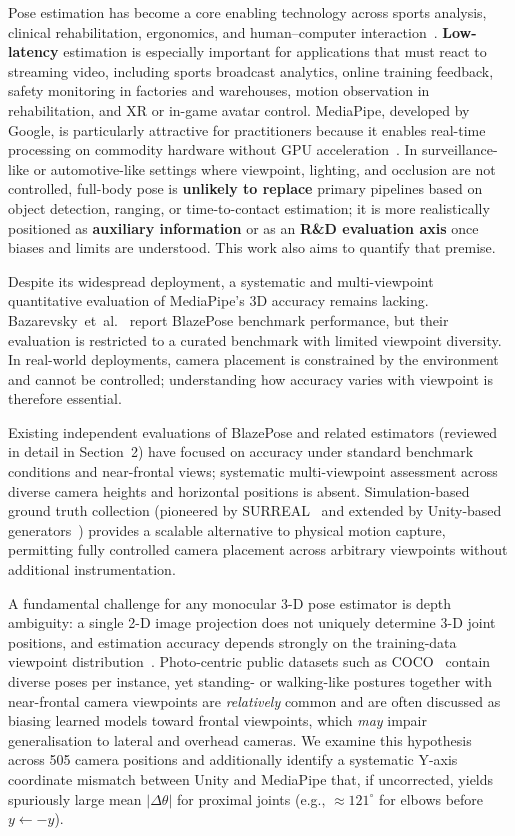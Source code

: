 \documentclass[english,fleqn]{ieej-e}
\begin{document}
Pose estimation has become a core enabling technology across sports
analysis, clinical rehabilitation, ergonomics, and human--computer
interaction~\cite{mediapipe,blazepose}.
\textbf{Low-latency} estimation is especially important for applications that
must react to streaming video, including sports broadcast analytics, online
training feedback, safety monitoring in factories and warehouses, motion
observation in rehabilitation, and XR or in-game avatar control.
MediaPipe, developed by Google, is particularly attractive for practitioners
because it enables real-time processing on commodity hardware without GPU
acceleration~\cite{mediapipe}.
In surveillance-like or automotive-like settings where viewpoint, lighting,
and occlusion are not controlled, full-body pose is \textbf{unlikely to
replace} primary pipelines based on object detection, ranging, or time-to-contact
estimation; it is more realistically positioned as \textbf{auxiliary
information} or as an \textbf{R\&D evaluation axis} once biases and limits
are understood.
This work also aims to quantify that premise.

Despite its widespread deployment, a systematic and multi-viewpoint
quantitative evaluation of MediaPipe's 3D accuracy remains lacking.
Bazarevsky~et~al.~\cite{blazepose} report BlazePose benchmark performance,
but their evaluation is restricted to a curated benchmark with limited
viewpoint diversity. In real-world deployments, camera placement is
constrained by the environment and cannot be controlled; understanding how
accuracy varies with viewpoint is therefore essential.

Existing independent evaluations of BlazePose and related estimators
(reviewed in detail in Section~2) have focused on accuracy under standard
benchmark conditions and near-frontal views; systematic multi-viewpoint
assessment across diverse camera heights and horizontal positions is
absent. Simulation-based ground truth collection (pioneered by
SURREAL~\cite{surreal} and extended by Unity-based
generators~\cite{peoplesanspeople}) provides a scalable alternative to
physical motion capture, permitting fully controlled camera placement across
arbitrary viewpoints without additional instrumentation.

A fundamental challenge for any monocular 3-D pose estimator is depth
ambiguity: a single 2-D image projection does not uniquely determine 3-D
joint positions, and estimation accuracy depends strongly on the training-data
viewpoint distribution~\cite{mehta2017}. Photo-centric public datasets such as
COCO~\cite{coco} contain diverse poses per instance, yet standing- or
walking-like postures together with near-frontal camera viewpoints are
\emph{relatively} common and are often discussed as biasing learned models
toward frontal viewpoints, which \emph{may} impair generalisation to lateral and
overhead cameras.
We examine this hypothesis across 505 camera positions and additionally
identify a systematic Y-axis coordinate mismatch between Unity and MediaPipe
that, if uncorrected, yields spuriously large mean $|\Delta\theta|$ for
proximal joints (e.g., $\approx121^{\circ}$ for elbows before
$y \leftarrow -y$).
\end{document}
